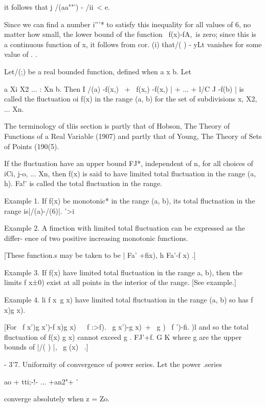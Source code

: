 it follows that j /(aa""') - /ii\ < e.

Since we can find a number i'''* to satisfy this inequality for all
values of 6, no matter how small, the lower bound of the function \
f(x)-fA,\ is zero; since this is a continuous function of x, it
follows from  cor. (i) that/( ) - yLt vanishes for some value of
. .


Let/(;) be a real bounded function, defined when a x b. Let

a Xi X2 ... : Xn b. Then I /(a) -f(x,) \ + \ f(x,) -f(x,) | + ... +
l/C J -f(b) | is called the fluctuation oi f(x) in the range (a, b)
for the set of subdivisions x, X2, ... Xn.

The terminology of tliis section is partly that of Hobson, The Theory
of Functions of a Real Variable (1907) and partly that of Young, The
Theory of Sets of Points (190(5).

%
%

If the fluctuation have an upper bound FJ*, independent of n, for all
choices of iCi, j-o, ... Xn, then f(x) is said to have limited total
fluctuation in the range (a, h). Fa!' is called the total fluctuation
in the range.

Example 1. If f(x) be monotonic* in the range (a, b), its total
fluctnation in the range is|/(a)-/(6)|. '>i

Example 2. A fimction with limited total fluctuation can be expressed
as the differ- ence of two positive increasing monotonic functions.

[These function.s may be taken to be | Fa' +fix), h Fa'-f x) .]

Example 3. If f(x) have limited total fluctuation in the range a, b),
then the limits f x±0) exist at all points in the interior of the
range. [See \hardsectionref{3}{2} example.]

Example 4. li f x\ g x) have limited total fluctuation in the range
(a, b) so has f x)g x).

[For \ f x')g x')-f x)g x)\ \ \ f :>f). \ g x')-g x)\ + \ g ) \ f
')-fi. )l and so the total fluctuation of f(x) g x) cannot exceed g .
FJ'+f. G K where g are the upper bounds of |/( ) |, \ g (x) \ .]

- 3'7. Uniformity of convergence of power series. Let the power
.series

ao + tti;-!- ... +an2"+  '

converge absolutely when z = Zo.

